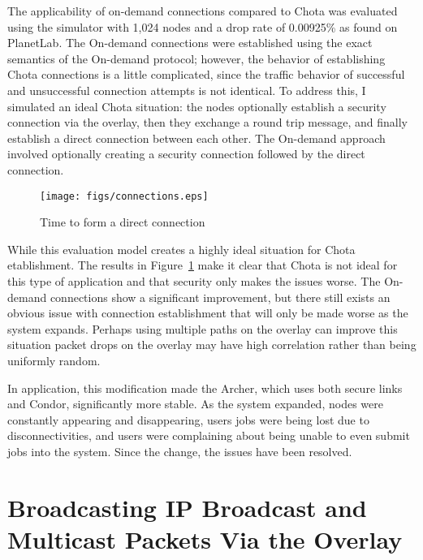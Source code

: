 The applicability of on-demand connections compared to Chota was evaluated
using the simulator with 1,024 nodes and a drop rate of 0.00925\% as found on
PlanetLab.  The On-demand connections were established using the exact semantics
of the On-demand protocol; however, the behavior of establishing Chota
connections is a little complicated, since the traffic behavior of successful
and unsuccessful connection attempts is not identical.  To address this, I
simulated an ideal Chota situation:  the nodes optionally establish a security
connection via the overlay, then they exchange a round trip message, and
finally establish a direct connection between each other.  The On-demand
approach involved optionally creating a security connection followed by the
direct connection.  

\begin{figure}
\centering
\texttt{[image: figs/connections.eps]}
\caption{Time to form a direct connection}
\label{fig:connections}
\end{figure}

While this evaluation model creates a highly ideal situation for Chota
etablishment.  The results in Figure~\ref{fig:connections} make it clear that
Chota is not ideal for this type of application and that security only makes
the issues worse.  The On-demand connections show a significant improvement, but
there still exists an obvious issue with connection establishment that will
only be made worse as the system expands.  Perhaps using multiple paths on the
overlay can improve this situation packet drops on the overlay may have high
correlation rather than being uniformly random.

In application, this modification made the Archer, which uses both secure links
and Condor, significantly more stable.  As the system expanded, nodes were
constantly appearing and disappearing, users jobs were being lost due to
disconnectivities, and users were complaining about being unable to even submit
jobs into the system.  Since the change, the issues have been resolved.

\section{Broadcasting IP Broadcast and Multicast Packets Via the Overlay}

